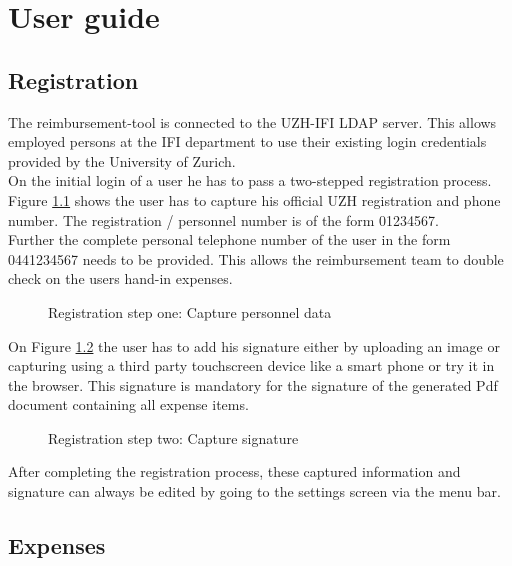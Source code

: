 \chapter{User guide}

\section{Registration}
\label{sec:registration}

The reimbursement-tool is connected to the UZH-IFI LDAP server. This allows employed persons at the IFI department to use their existing login credentials provided by the University of Zurich.\\
On the initial login of a user he has to pass a two-stepped registration process. Figure \ref{fig:registration-step01} shows the user has to capture his official UZH registration and phone number. The registration / personnel number is of the form 01234567.\\
Further the complete personal telephone number of the user in the form 0441234567 needs to be provided. This allows the reimbursement team to double check on the users hand-in expenses. 

\begin{figure}[H]
    \centering
    \caption{Registration step one: Capture personnel data}
    \label{fig:registration-step01}
\end{figure}

On Figure \ref{fig:registration-step02} the user has to add his signature either by uploading an image or capturing using a third party touchscreen device like a smart phone or try it in the browser. This signature is mandatory for the signature of the generated Pdf document containing all expense items.  

\begin{figure}[H]
    \centering
    \caption{Registration step two: Capture signature}
    \label{fig:registration-step02}
\end{figure}

After completing the registration process, these captured information and signature can always be edited by going to the settings screen via the menu bar.
\clearpage

\section{Expenses}

